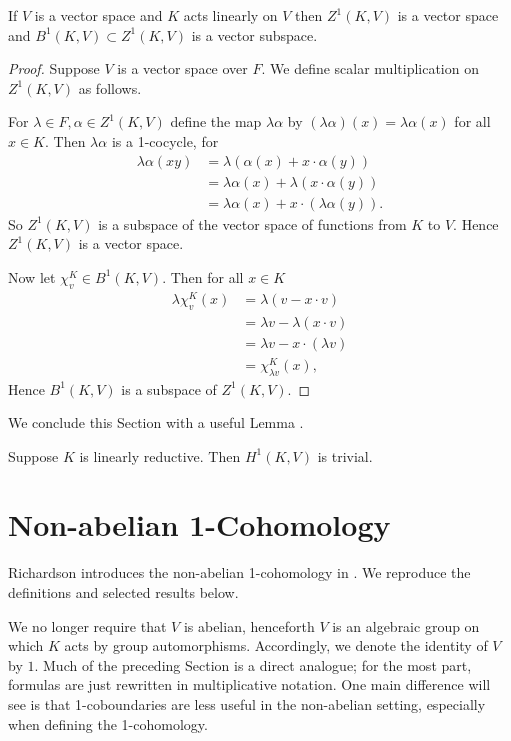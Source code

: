 \begin{lemma} \label{vspace} If $V$ is a vector space and $K$ acts linearly on $V$ then $Z^1(K, V)$ is a vector space and $B^1(K, V)\subset Z^1(K, V)$ is a vector subspace.
\end{lemma}
\begin{proof}
	Suppose $V$ is a vector space over $F$. We define scalar multiplication on $Z^1(K, V)$ as follows.

For $\lambda \in F, \alpha \in Z^1(K, V)$ define the map $\lambda\alpha$ by $(\lambda\alpha)(x) = \lambda\alpha(x)$ for all $x \in K$. Then $\lambda\alpha$ is a 1-cocycle, for
\begin{align*}
	\lambda \alpha(xy) &= \lambda\left( \alpha(x) + x \cdot \alpha(y)\right) \\
	&= \lambda\alpha(x) + \lambda(x\cdot \alpha(y)) \\
	&= \lambda\alpha(x) + x \cdot (\lambda\alpha(y)).
\end{align*}
So $Z^1(K, V)$ is a subspace of the vector space of functions from $K$ to $V$. Hence $Z^1(K, V)$ is a vector space.

Now let $\chi^K_v \in B^1(K, V)$. Then for all $x \in K$
\begin{align*}
	\lambda\chi^K_v(x) &= \lambda\left(v - x \cdot v\right) \\
		&= \lambda v - \lambda(x \cdot v) \\
		&= \lambda v - x \cdot (\lambda v) \\
		&= \chi^K_{\lambda v}(x),
\end{align*}
Hence $B^1(K, V)$ is a subspace of $Z^1(K, V)$.
\end{proof}

We conclude this Section with a useful Lemma \cite[Proposition 1]{kemper2000characterization}.
\begin{lemma} Suppose $K$ is linearly reductive. Then $H^1(K, V)$ is trivial.
  \label{lem:lin_red_h}
\end{lemma}

\section{Non-abelian 1-Cohomology}
	
Richardson introduces the non-abelian 1-cohomology in \cite{richardson1982orbits}. We reproduce the definitions and selected results below.

We no longer require that $V$ is abelian, henceforth $V$ is an algebraic group on which $K$ acts by group automorphisms. Accordingly, we denote the identity of $V$ by $1$. Much of the preceding Section is a direct analogue; for the most part, formulas are just rewritten in multiplicative notation.
One main difference will see is that 1-coboundaries are less useful in the non-abelian setting, especially when defining the 1-cohomology.

